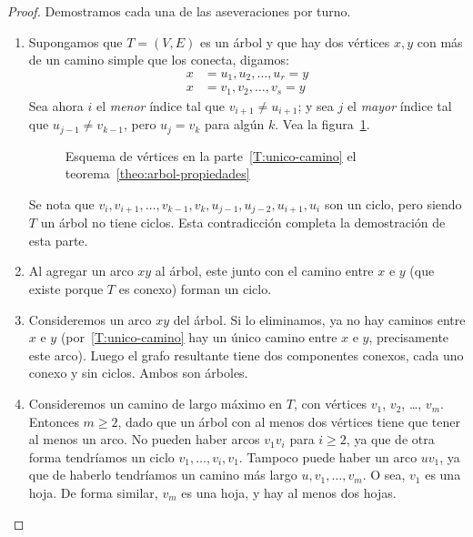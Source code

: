  \begin{proof}
    Demostramos cada una de las aseveraciones por turno.
    \begin{enumerate}[label=\textbf{T\arabic{*}:},
		      ref=T\arabic{*},
		      start=3]
    \item
      Supongamos que \(T = (V, E)\) es un árbol
      y que hay dos vértices \(x, y\)
      con más de un camino simple que los conecta,
      digamos:
      \begin{align*}
	x &= u_1, u_2, \dots, u_r =  y \\
	x &= v_1, v_2, \dots, v_s =  y
      \end{align*}
      Sea ahora \(i\) el \emph{menor} índice
      tal que \(v_{i + 1} \ne u_{i + 1}\);
      y sea \(j\) el \emph{mayor} índice
      tal que \(u_{j - 1} \ne v_{k - 1}\),
      pero \(u_j = v_k\) para algún \(k\).
      Vea la figura~\ref{fig:teo-T3}.
      \begin{figure}[htbp]
	\centering
	\caption{Esquema de vértices
		 en la parte~\ref{T:unico-camino}
		 el teorema~\ref{theo:arbol-propiedades}}
	\label{fig:teo-T3}
      \end{figure}
      Se nota que
      \(v_i, v_{i + 1}, \dots,
	 v_{k - 1}, v_k, u_{j - 1}, u_{j - 2}, u_{i + 1}, u_i\)
      son un ciclo,
      pero siendo \(T\) un árbol no tiene ciclos.
      Esta contradicción completa la demostración de esta parte.
    \item
      Al agregar un arco \(x y\) al árbol,
      este junto con el camino entre \(x\) e \(y\)
      (que existe porque \(T\) es conexo)
      forman un ciclo.
    \item
      Consideremos un arco \(x y\) del árbol.
      Si lo eliminamos,
      ya no hay caminos entre \(x\) e \(y\)
      (por~\ref{T:unico-camino}
       hay un único camino entre \(x\) e \(y\),
       precisamente este arco).
      Luego el grafo resultante tiene dos componentes conexos,
      cada uno conexo y sin ciclos.
      Ambos son árboles.
    \item
      Consideremos un camino de largo máximo en \(T\),
      con vértices \(v_1\), \(v_2\), \ldots, \(v_m\).
      Entonces \(m \ge 2\),
      dado que un árbol con al menos dos vértices
      tiene que tener al menos un arco.
      No pueden haber arcos \(v_1 v_i\) para \(i \ge 2\),
      ya que de otra forma
      tendríamos un ciclo \(v_1, \dotsc, v_i, v_1\).
      Tampoco puede haber un arco \(u v_1\),
      ya que de haberlo
      tendríamos un camino más largo \(u, v_1, \dotsc, v_m\).
      O sea,
      \(v_1\) es una hoja.
      De forma similar,
      \(v_m\) es una hoja,
      y hay al menos dos hojas.


\end{enumerate}
\end{proof}
